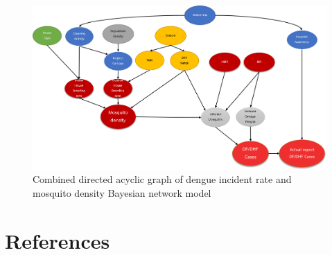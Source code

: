 \documentclass[review]{elsarticle}
\begin{document}
\begin{figure}[htbp]
	\begin{center}
		\includegraphics[width=150mm]{./figures/bn_md_dr}
		\caption{Combined directed acyclic graph of dengue incident rate and mosquito density Bayesian network model}
		\label{figure-bn_md_dr}
	\end{center}
\end{figure}


\section*{References}


\end{document}
